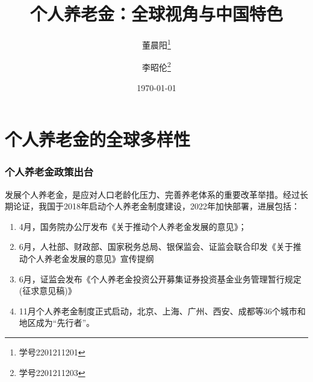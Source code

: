 \documentclass[a4paper,zihao=5]{ctexbeamer}
\title{个人养老金：全球视角与中国特色}
\author{董晨阳\thanks{学号2201211201}\and 李昭伦\thanks{学号2201211203}}
\date{\today}
\begin{document}
\maketitle
\section{个人养老金的全球多样性}
\begin{frame}
    \frametitle{个人养老金政策出台}
    发展个人养老金，是应对人口老龄化压力、完善养老体系的重要改革举措。经过长期论证，我国于2018年启动个人养老金制度建设，2022年加快部署，进展包括：
    \begin{enumerate}
        \item 4月，国务院办公厅发布《关于推动个人养老金发展的意见》；
        \item 6月，人社部、财政部、国家税务总局、银保监会、证监会联合印发《关于推动个人养老金发展的意见》宣传提纲
        \item 6月，证监会发布《个人养老金投资公开募集证券投资基金业务管理暂行规定(征求意见稿)》
        \item 11月个人养老金制度正式启动，北京、上海、广州、西安、成都等36个城市和地区成为“先行者”。
    \end{enumerate}
\end{frame}
\end{document}
